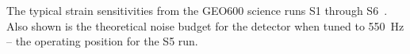\label{figure:GEOstrains}
The typical strain sensitivities from the GEO600 science runs S1
through S6~\cite{GEOcurves}. Also shown is the theoretical noise budget for the
detector when tuned to 550~Hz -- the operating position for the S5 run.
